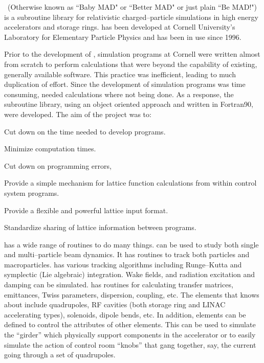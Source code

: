 
\bmad\ (Otherwise known as ``Baby MAD" or ``Better MAD" or just plain
``Be MAD!") is a subroutine library for relativistic
charged--particle simulations in high energy accelerators and
storage rings. \bmad has been developed at Cornell University's
Laboratory for Elementary Particle Physics and has been in use since
1996. 

Prior to the development of \bmad, simulation programs at Cornell were
written almost from scratch to perform calculations that were beyond
the capability of existing, generally available software. This
practice was inefficient, leading to much duplication of effort.
Since the development of simulation programs was time consuming,
needed calculations where not being done.  
As a response, the \bmad subroutine library, using an
object oriented approach and written in Fortran90, were developed.
The aim of the \bmad project was to:
\begin{Itemize}
\item Cut down on the time needed to develop programs.
\item Minimize computation times.
\item Cut down on programming errors, 
\item Provide a simple mechanism for lattice function calculations
from within control system programs.
\item Provide a flexible and powerful lattice input format.
\item Standardize sharing of lattice information between 
programs.
\end{Itemize}

\bmad has a wide range of routines to do many things.  \bmad can be
used to study both single and multi--particle beam dynamics.  It has
routines to track both particles and macroparticles. \bmad has various
tracking algorithms including Runge--Kutta and symplectic (Lie
algebraic) integration.  Wake fields, and radiation excitation and
damping can be simulated. \bmad has routines for calculating transfer
matrices, emittances, Twiss parameters, dispersion, coupling, etc. The
elements that \bmad knows about include quadrupoles, RF cavities (both
storage ring and LINAC accelerating types), solenoids, dipole bends,
etc. In addition, elements can be defined to control the attributes of
other elements. This can be used to simulate the ``girder'' which
physically support components in the accelerator or to easily simulate
the action of control room ``knobs'' that gang together, say, the
current going through a set of quadrupoles.

